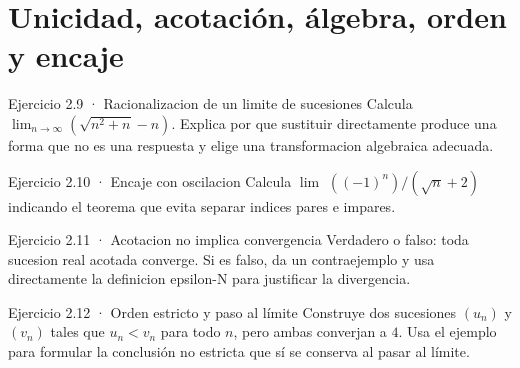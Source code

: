 \documentclass[10pt,a4paper,oneside,openany]{book}
\begin{document}
\section{Unicidad, acotación, álgebra, orden y encaje}
\begin{PSevenExerciseFixed}{Ejercicio 2.9 · Racionalizacion de un limite de sucesiones}
Calcula \(\lim_{n\to \infty }(\sqrt{n^{2}+n}-n)\). Explica por que sustituir directamente produce una forma que no es una respuesta y elige una transformacion algebraica adecuada.
\end{PSevenExerciseFixed}
\begin{PSevenExerciseFixed}{Ejercicio 2.10 · Encaje con oscilacion}
Calcula \(\lim\) \(((-1)^n)/(\sqrt{n}+2)\) indicando el teorema que evita separar indices pares e impares.
\end{PSevenExerciseFixed}
\begin{PSevenExerciseFixed}{Ejercicio 2.11 · Acotacion no implica convergencia}
Verdadero o falso: toda sucesion real acotada converge. Si es falso, da un contraejemplo y usa directamente la definicion epsilon-N para justificar la divergencia.
\end{PSevenExerciseFixed}
\begin{PSevenExerciseFixed}{Ejercicio 2.12 · Orden estricto y paso al límite}
Construye dos sucesiones \((u_n)\) y \((v_n)\) tales que \(u_n<v_n\) para todo \(n\), pero ambas converjan a \(4\). Usa el ejemplo para formular la conclusión no estricta que sí se conserva al pasar al límite.
\end{PSevenExerciseFixed}
\end{document}
